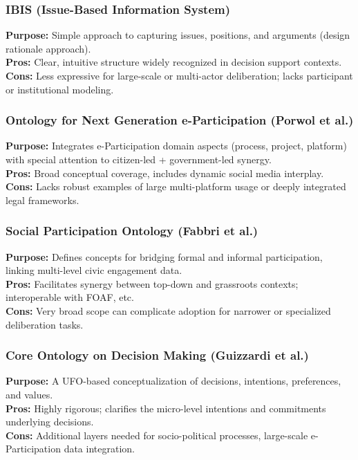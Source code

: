 \documentclass[11pt,a4paper]{article}
\begin{document}
\subsubsection{IBIS (Issue-Based Information System) \cite{Kunz1970}}
\textbf{Purpose:} Simple approach to capturing issues, positions, and arguments (design rationale approach).\\
\textbf{Pros:} Clear, intuitive structure widely recognized in decision support contexts.\\
\textbf{Cons:} Less expressive for large-scale or multi-actor deliberation; lacks participant or institutional modeling.

\subsubsection{Ontology for Next Generation e-Participation (Porwol et al.) \cite{Porwol2016}}
\textbf{Purpose:} Integrates e-Participation domain aspects (process, project, platform) with special attention to citizen-led + government-led synergy.\\
\textbf{Pros:} Broad conceptual coverage, includes dynamic social media interplay.\\
\textbf{Cons:} Lacks robust examples of large multi-platform usage or deeply integrated legal frameworks.

\subsubsection{Social Participation Ontology (Fabbri et al.) \cite{Fabbri2015}}
\textbf{Purpose:} Defines concepts for bridging formal and informal participation, linking multi-level civic engagement data.\\
\textbf{Pros:} Facilitates synergy between top-down and grassroots contexts; interoperable with FOAF, etc.\\
\textbf{Cons:} Very broad scope can complicate adoption for narrower or specialized deliberation tasks.

\subsubsection{Core Ontology on Decision Making (Guizzardi et al.) \cite{GuizzardiDecision2020}}
\textbf{Purpose:} A UFO-based conceptualization of decisions, intentions, preferences, and values.\\
\textbf{Pros:} Highly rigorous; clarifies the micro-level intentions and commitments underlying decisions.\\
\textbf{Cons:} Additional layers needed for socio-political processes, large-scale e-Participation data integration.
\end{document}
